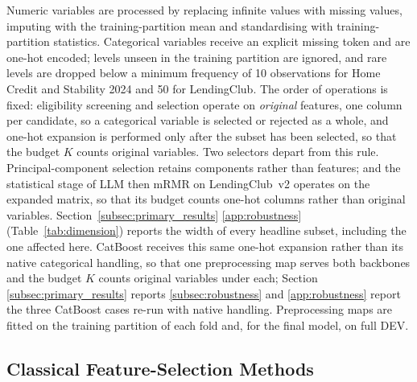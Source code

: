 \documentclass[final,5p,twocolumn]{elsarticle}
\newcommand{\Kfeat}{K}
\providecommand{\DIFaddtex}[1]{{\protect\color{blue} \sf #1}} %
\providecommand{\DIFdeltex}[1]{{\protect\color{red} \scriptsize #1}} %
\providecommand{\DIFaddbegin}{} %
\providecommand{\DIFaddend}{} %
\providecommand{\DIFdelbegin}{} %
\providecommand{\DIFdelend}{} %
\providecommand{\DIFadd}[1]{\texorpdfstring{\DIFaddtex{#1}}{#1}} %
\providecommand{\DIFdel}[1]{\texorpdfstring{\DIFdeltex{#1}}{}} %
\begin{document}
Numeric variables are processed by replacing infinite values with missing values, imputing with the training-partition mean and standardising with training-partition statistics. Categorical variables receive an explicit missing token and are one-hot encoded; levels unseen in the training partition are ignored, and rare levels are dropped below a minimum frequency of 10 observations for Home Credit and Stability 2024 and 50 for LendingClub. The order of operations is fixed: eligibility screening and selection operate on \emph{original} features, one column per candidate, so a categorical variable is selected or rejected as a whole, and one-hot expansion is performed only after the subset has been selected, so that the budget $\Kfeat$ counts original variables. Two selectors depart from this rule. Principal-component selection retains components rather than features; and the statistical stage of LLM then mRMR on LendingClub~v2 operates on the expanded matrix, so that its budget counts one-hot columns rather than original variables. \DIFdelbegin \DIFdel{Section~\ref{subsec:primary_results} }\DIFdelend \DIFaddbegin \DIFadd{\ref{app:robustness} (Table~\ref{tab:dimension}) }\DIFaddend reports the width of every headline subset, including the one affected here. CatBoost receives this same one-hot expansion rather than its native categorical handling, so that one preprocessing map serves both backbones and the budget $\Kfeat$ counts original variables under each; Section~\DIFdelbegin \DIFdel{\ref{subsec:primary_results} reports }\DIFdelend \DIFaddbegin \DIFadd{\ref{subsec:robustness} and \ref{app:robustness} report }\DIFaddend the three CatBoost cases re-run with native handling. Preprocessing maps are fitted on the training partition of each fold and, for the final model, on full DEV.

\subsection{Classical Feature-Selection Methods}
\label{subsec:classical_fs}
\end{document}
